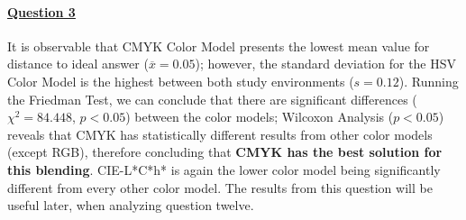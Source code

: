 \paragraph{\ul{Question 3}}
%
It is observable that CMYK Color Model presents the lowest mean value for distance to ideal answer ($\overline{x} = 0.05$); however,
the standard deviation for the HSV Color Model is the highest between both study environments ($s = 0.12$).
Running the Friedman Test, we can conclude that there are significant differences ($\chi^2 = 84.448$, $p < 0.05$) between the color models;
Wilcoxon Analysis ($p < 0.05$) reveals that CMYK has statistically different results from other color models (except RGB), therefore concluding that
\textbf{CMYK has the best solution for this blending}. CIE-L*C*h* is again the lower color model being
significantly different from every other color model. The results from this question will be useful later, when analyzing question twelve.
%
